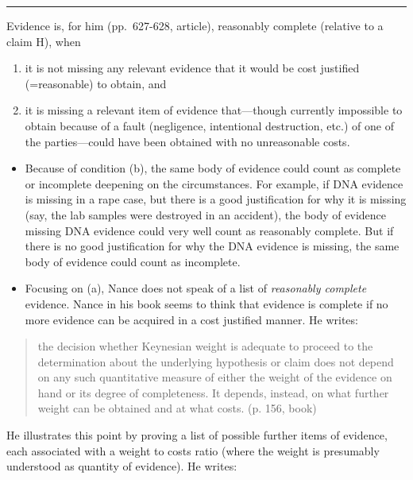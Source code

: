 \documentclass[
  10pt,
  dvipsnames,enabledeprecatedfontcommands]{scrartcl}
\begin{document}
\begin{center}\rule{0.5\linewidth}{0.5pt}\end{center}

Evidence is, for him (pp.~627-628, article), reasonably complete
(relative to a claim H), when

\begin{enumerate}
\def\labelenumi{(\alph{enumi})}
\item
  it is not missing any relevant evidence that it would be cost
  justified (=reasonable) to obtain, and
\item
  it is missing a relevant item of evidence that---though currently
  impossible to obtain because of a fault (negligence, intentional
  destruction, etc.) of one of the parties---could have been obtained
  with no unreasonable costs.
\end{enumerate}

\begin{itemize}
\item
  Because of condition (b), the same body of evidence could count as
  complete or incomplete deepening on the circumstances. For example, if
  DNA evidence is missing in a rape case, but there is a good
  justification for why it is missing (say, the lab samples were
  destroyed in an accident), the body of evidence missing DNA evidence
  could very well count as reasonably complete. But if there is no good
  justification for why the DNA evidence is missing, the same body of
  evidence could count as incomplete.
\item
  Focusing on (a), Nance does not speak of a list of \emph{reasonably
  complete} evidence. Nance in his book seems to think that evidence is
  complete if no more evidence can be acquired in a cost justified
  manner. He writes:
\end{itemize}

\begin{quote}
the decision whether Keynesian weight is adequate to proceed to the determination about the underlying hypothesis or claim does not depend on any such quantitative measure of either the weight of the evidence on hand or its degree of completeness. It depends, instead, on what further weight can be obtained and at what costs. (p. 156, book)
\end{quote}

He illustrates this point by proving a list of possible further items of
evidence, each associated with a weight to costs ratio (where the weight
is presumably understood as quantity of evidence). He writes:
\end{document}
